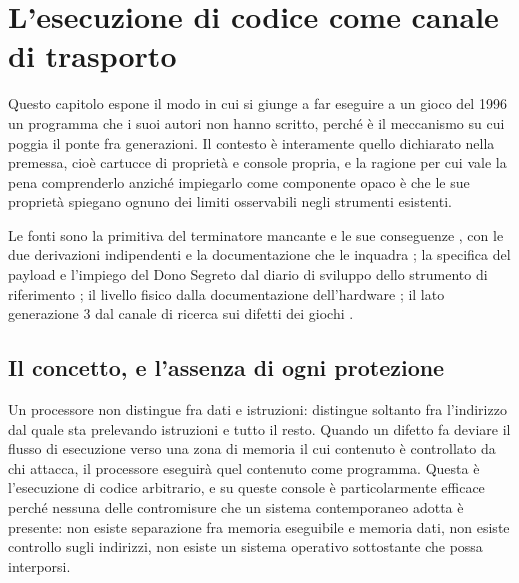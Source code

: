 
\chapter{L'esecuzione di codice come canale di trasporto}
\label{cap:esecuzione}

Questo capitolo espone il modo in cui si giunge a far eseguire a un gioco del 1996 un programma che i suoi autori non hanno scritto, perché è il meccanismo su cui poggia il ponte fra generazioni. Il contesto è interamente quello dichiarato nella premessa, cioè cartucce di proprietà e console propria, e la ragione per cui vale la pena comprenderlo anziché impiegarlo come componente opaco è che le sue proprietà spiegano ognuno dei limiti osservabili negli strumenti esistenti.

Le fonti sono la primitiva del terminatore mancante e le sue conseguenze \cite{cableclubhack}, con le due derivazioni indipendenti \cite{pksploit,linkhack} e la documentazione che le inquadra \cite{blog-phasip}; la specifica del payload e l'impiego del Dono Segreto dal diario di sviluppo dello strumento di riferimento \cite{devlog-ptgb}; il livello fisico dalla documentazione dell'hardware \cite{pandocs,gbatek}; il lato generazione 3 dal canale di ricerca sui difetti dei giochi \cite{gcri-discord}.

\section{Il concetto, e l'assenza di ogni protezione}

Un processore non distingue fra dati e istruzioni: distingue soltanto fra l'indirizzo dal quale sta prelevando istruzioni e tutto il resto. Quando un difetto fa deviare il flusso di esecuzione verso una zona di memoria il cui contenuto è controllato da chi attacca, il processore eseguirà quel contenuto come programma. Questa è l'esecuzione di codice arbitrario, e su queste console è particolarmente efficace perché nessuna delle contromisure che un sistema contemporaneo adotta è presente: non esiste separazione fra memoria eseguibile e memoria dati, non esiste controllo sugli indirizzi, non esiste un sistema operativo sottostante che possa interporsi.

